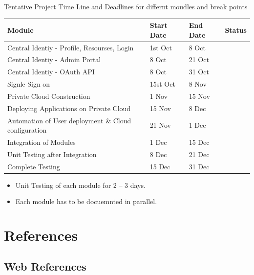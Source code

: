 \documentclass[12pt]{report}
\begin{document}
	Tentative Project Time Line and Deadlines for differnt moudles and break points
	
	\begin{table}[H]
		
		\begin{tabular}{ | l | l | l | l |}
			\hline 
			\textbf{Module} & \textbf{Start Date} & \textbf{End Date} & \textbf{Status} \\
			\hline 
			Central Identiy - Profile, Resourses, Login  & 1st Oct & 8 Oct & \\
			\hline
			Central Identiy - Admin Portal & 8 Oct & 21 Oct & \\
			\hline
			Central Identiy - OAuth API & 8 Oct & 31 Oct & \\
			\hline
			Signle Sign on & 15st Oct & 8 Nov & \\
			\hline
			Private Cloud Construction & 1 Nov & 15 Nov  & \\
			\hline 
			Deploying Applications on Private Cloud & 15 Nov & 8 Dec & \\
			\hline 
			Automation of User deployment \& Cloud configuration & 21 Nov & 1 Dec & \\
			\hline 
			Integration of Modules & 1 Dec & 15 Dec & \\
			\hline
			Unit Testing after Integration & 8 Dec & 21 Dec  & \\
			\hline
			Complete Testing & 15 Dec & 31 Dec&  \\
				
			\hline 
		\end{tabular}
		
	\end{table}
	
	\begin{itemize}
		\item Unit Testing of each module for 2 -- 3 days.
		\item Each module has to be docuemnted in parallel.
	\end{itemize}
	
\chapter{References}

\section{Web References}
\end{document}

